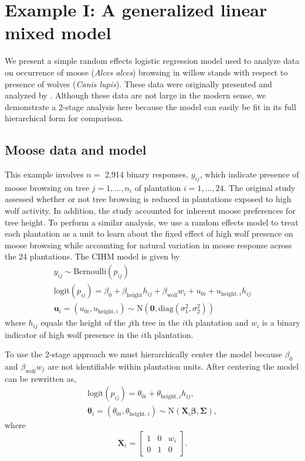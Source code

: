 \documentclass[12pt]{article}
\newcommand{\bt}{\boldsymbol{\theta}}
\newcommand{\bb}{\boldsymbol{\beta}}
\newcommand{\bSig}{\boldsymbol{\Sigma}}
\begin{document}
\section{Example I: A generalized linear mixed model} \label{sec:moose.wolf}

We present a simple random effects logistic regression model used to analyze data on occurrence of moose ({\it Alces alces}) browsing in willow stands with respect to presence of wolves ({\it Canis lupis}). These data were originally presented and analyzed by \cite{van2018does}. Although these data are not large in the modern sense, we demonstrate a 2-stage analysis here because the model can easily be fit in its full hierarchical form for comparison. 

\subsection{Moose data and model}

This example involves $n =$ 2,914 binary responses, $y_{ij}$, which indicate presence of moose browsing on tree $j=1,\dots,n_i$ of plantation $i=1,\dots,24$. The original study assessed whether or not tree browsing is reduced in plantations exposed to high wolf activity. In addition, the study accounted for inherent moose preferences for tree height. To perform a similar analysis, we use a random effects model to treat each plantation as a unit to learn about the fixed effect of high wolf presence on moose browsing while accounting for natural variation in moose response across the 24 plantations. The CIHM model is given by
\[
\begin{gathered}
y_{ij} \sim \text{Bernoulli}(p_{ij}) \\
\text{logit}(p_{ij}) = \beta_0 + \beta_{\text{height}}h_{ij} + \beta_{\text{wolf}}w_i + u_{0i} + u_{\text{height},i} h_{ij}\\
\mathbf{u}_i = (u_{0i}, u_{\text{height},i}) \sim \text{N}(\mathbf{0},\text{diag}(\sigma_1^2, \sigma_2^2))
\end{gathered}
\]
where $h_{ij}$ equals the height of the $j$th tree in the $i$th plantation and $w_i$ is a binary indicator of high wolf presence in the $i$th plantation.

To use the 2-stage approach we must hierarchically center the model because $\beta_0$ and $\beta_{\text{wolf}}w_j$ are not identifiable within plantation units. After centering the model can be rewritten as,
\[
\begin{gathered}
\text{logit}(p_{ij}) = \theta_{0i} + \theta_{\text{height},i}h_{ij},\\
\bt_i = (\theta_{0i}, \theta_{\text{height},i}) \sim \text{N}(\mathbf{X}_i\bb, \bSig) ,
\end{gathered}
\]
where
\[
\mathbf{X}_i = \left[ 
\begin{array}{ccc}
1 & 0 & w_i \\
0 & 1 & 0
\end{array}
\right].
\]
\end{document}
